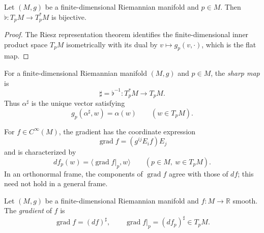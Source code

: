 \begin{lemma}
\label{lem:flat-bijective}





Let $(M,g)$ be a finite-dimensional Riemannian manifold and $p\in M$. Then
$\flat\colon T_pM\to T_p^*M$ is bijective.
\end{lemma}

\begin{proof}

\sketch The Riesz representation theorem identifies the finite-dimensional inner product space
$T_pM$ isometrically with its dual by $v\mapsto g_p(v,\cdot)$, which is the flat map.
\end{proof}

\begin{definition}
\label{def:sharp-map}





For a finite-dimensional Riemannian manifold $(M,g)$ and $p\in M$, the
\emph{sharp map} is
\[
\sharp=\flat^{-1}\colon T_p^*M\longrightarrow T_pM.
\]
Thus $\alpha^\sharp$ is the unique vector satisfying
\[
g_p(\alpha^\sharp,w)=\alpha(w)
\qquad (w\in T_pM).
\]
\end{definition}

For $f\in C^\infty(M)$, the gradient has the coordinate expression
\[
\operatorname{grad}f=(g^{ij}E_if)E_j
\]
and is characterized by
\begin{equation}
df_p(w)=\langle\operatorname{grad}f|_p,w\rangle
\qquad (p\in M,\ w\in T_pM). \tag{2.14}
\end{equation}
In an orthonormal frame, the components of $\operatorname{grad}f$ agree with those
of $df$; this need not hold in a general frame.

\begin{definition}
\label{def:gradient}





Let $(M,g)$ be a finite-dimensional Riemannian manifold and $f\colon M\to\mathbb R$
smooth. The \emph{gradient} of $f$ is
\[
\operatorname{grad}f=(df)^\sharp,
\qquad \operatorname{grad}f|_p=(df_p)^\sharp\in T_pM.
\]
\end{definition}

